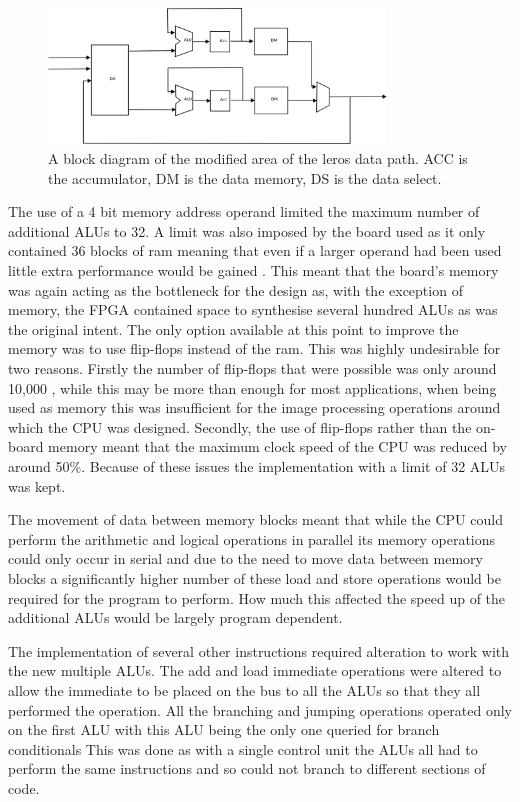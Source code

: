 \begin{figure}[ht]
	\begin{center}
		\includegraphics[width=0.8\textwidth]{images/new_path}
	\end{center}
	\caption{A block diagram of the modified area of the leros data path. ACC is the accumulator, DM is the data memory, DS is the data select.}
	\label{new_path}
\end{figure}

The use of a 4 bit memory address operand limited the maximum number of additional ALUs to 32. A limit was also imposed by the board used as it only contained 36 blocks of ram meaning that even if a larger operand had been used little extra performance would be gained \cite{spartan_ram}. This meant that the board's memory was again acting as the bottleneck for the design as, with the exception of memory, the FPGA contained space to synthesise several hundred ALUs as was the original intent. The only option available at this point  to improve the memory was to use flip-flops instead of the ram. This was highly undesirable for two reasons. Firstly the number of flip-flops that were possible was only around 10,000 \cite{spartan_user}, while this may be more than enough for most applications, when being used as memory this was insufficient for the image processing operations around which the CPU was designed. Secondly, the use of flip-flops rather than the on-board memory meant that the maximum clock speed of the CPU was reduced by around 50\%. Because of these issues the implementation with a limit of 32 ALUs was kept.

The movement of data between memory blocks meant that while the CPU could perform the arithmetic and logical operations in parallel its memory operations could only occur in serial and due to the need to move data between memory blocks a significantly higher number of these load and store operations would be required for the program to perform. How much this affected the speed up of the additional ALUs would be largely program dependent. 

The implementation of several other instructions required alteration to work with the new multiple ALUs. The add and load immediate operations were altered to allow the immediate to be placed on the bus to all the ALUs so that they all performed the operation. All the branching and jumping operations operated only on the first ALU with this ALU being the only one  queried for branch conditionals This was done as with a single control unit the ALUs all had to perform the same instructions and so could not branch to different sections of code.
